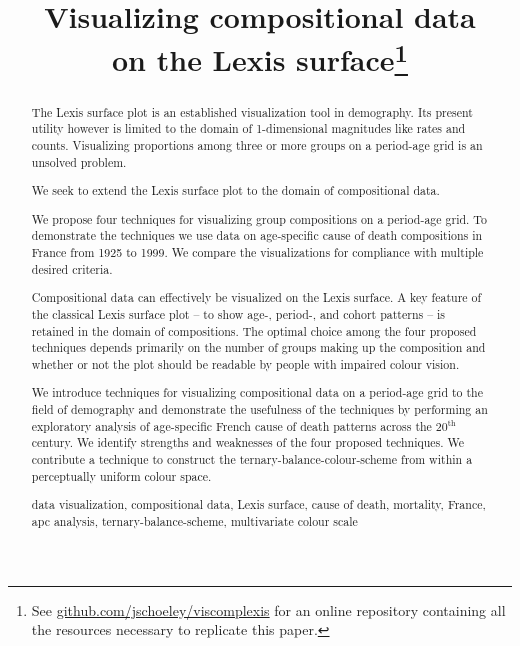 \documentclass[parskip=half]{scrartcl}
\title{Visualizing compositional data \\ on the Lexis surface\footnote{See \url{github.com/jschoeley/viscomplexis} for an online repository containing all the resources necessary to replicate this paper.}}
\begin{document}
\maketitle

\begin{abstract}

The Lexis surface plot is an established visualization tool in demography. Its present utility however is limited to the domain of 1-dimensional magnitudes like rates and counts. Visualizing proportions among three or more groups on a period-age grid is an unsolved problem.

We seek to extend the Lexis surface plot to the domain of compositional data.

We propose four techniques for visualizing group compositions on a period-age grid. To demonstrate the techniques we use data on age-specific cause of death compositions in France from 1925 to 1999. We compare the visualizations for compliance with multiple desired criteria.

Compositional data can effectively be visualized on the Lexis surface. A key feature of the classical Lexis surface plot -- to show age-, period-, and cohort patterns -- is retained in the domain of compositions. The optimal choice among the four proposed techniques depends primarily on the number of groups making up the composition and whether or not the plot should be readable by people with impaired colour vision.

We introduce techniques for visualizing compositional data on a period-age grid to the field of demography and demonstrate the usefulness of the techniques by performing an exploratory analysis of age-specific French cause of death patterns across the 20$^\text{th}$ century. We identify strengths and weaknesses of the four proposed techniques. We contribute a technique to construct the ternary-balance-colour-scheme from within a perceptually uniform colour space.

\bigskip{}
data visualization, compositional data, Lexis surface, cause of death, mortality, France, apc analysis, ternary-balance-scheme, multivariate colour scale

\end{abstract}

\clearpage

\end{document}
